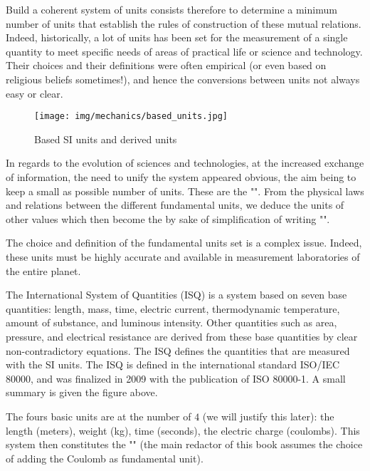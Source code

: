 	Build a coherent system of units consists therefore to determine a minimum number of units that establish the rules of construction of these mutual relations. Indeed, historically, a lot of units has been set for the measurement of a single quantity to meet specific needs of areas of practical life or science and technology. Their choices and their definitions were often empirical (or even based on religious beliefs sometimes!), and hence the conversions between units not always easy or clear.
	\begin{figure}[H]
		\centering
		\texttt{[image: img/mechanics/based\_units.jpg]}
		\caption{Based SI units and derived units}
	\end{figure}
	In regards to the evolution of sciences and technologies, at the increased exchange of information, the need to unify the system appeared obvious, the aim being to keep a small as possible number of units. These are the "". From the physical laws and relations between the different fundamental units, we deduce the units of other values which then become the by sake of simplification of writing "".
	
	The choice and definition of the fundamental units set is a complex issue. Indeed, these units must be highly accurate and available in measurement laboratories of the entire planet.
	
	\begin{tcolorbox}[title=Remarks,colframe=black,arc=10pt]
	The International System of Quantities (ISQ) is a system based on seven base quantities: length, mass, time, electric current, thermodynamic temperature, amount of substance, and luminous intensity. Other quantities such as area, pressure, and electrical resistance are derived from these base quantities by clear non-contradictory equations. The ISQ defines the quantities that are measured with the SI units. The ISQ is defined in the international standard ISO/IEC 80000, and was finalized in 2009 with the publication of ISO 80000-1. A small summary is given the figure above.
	\end{tcolorbox}
	The fours basic units are at the number of  $4$ (we will justify this later): the length (meters), weight (kg), time (seconds), the electric charge (coulombs). This system then constitutes the "" (the main redactor of this book assumes the choice of adding the Coulomb as fundamental unit).
	
